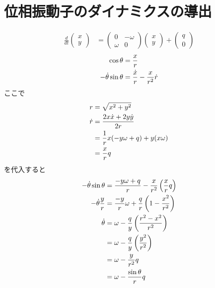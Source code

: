 \documentclass[twocolumn,11pt]{jarticle}
\begin{document}
\section{位相振動子のダイナミクスの導出}
  \begin{align}
    \frac{d}{dt}
    \begin{pmatrix}
      x\\y  
    \end{pmatrix}
    &=
    \begin{pmatrix}
      0 & -\omega \\
      \omega & 0
    \end{pmatrix}
    \begin{pmatrix}
      x\\y  
    \end{pmatrix}
    +
    \begin{pmatrix}
      q\\0
    \end{pmatrix}
  \end{align}
\begin{align}
\cos\theta&=\frac{x}{r}\notag\\
-\dot{\theta}\sin\theta&=\frac{\dot{x}}{r}-\frac{x}{r^2}\dot{r}
\end{align}
ここで
\begin{align}
  r&=\sqrt{x^2+y^2}\notag\\
  \dot{r}&=\frac{2x\dot{x}+2y\dot{y}}{2r}\notag\\
  &=\frac{1}{r}{x(-y\omega+q)+y(x\omega)}\notag\\
  &=\frac{x}{r}q
\end{align}
を代入すると
\begin{align}
-\dot{\theta}\sin\theta&=\frac{-y\omega+q}{r}-\frac{x}{r^2}\left(\frac{x}{r}q\right)\notag\\
-\dot{\theta}\frac{y}{r}&=\frac{-y}{r}\omega+\frac{q}{r}\left(1-\frac{x^2}{r^2}\right)\notag\\
\dot{\theta}&=\omega-\frac{q}{y}\left(\frac{r^2-x^2}{r^2}\right)\notag\\
&=\omega-\frac{q}{y}\left(\frac{y^2}{r^2}\right)\notag\\
&=\omega-\frac{y}{r^2}q\notag\\
&=\omega-\frac{\sin\theta}{r}q
\end{align}
\end{document}
